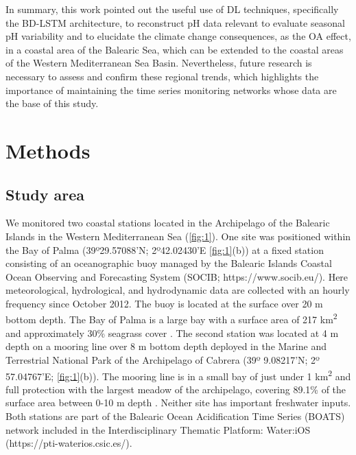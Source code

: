 In summary, this work pointed out the useful use of DL techniques,
specifically the BD-LSTM architecture, to reconstruct pH data relevant to
evaluate seasonal pH variability and to elucidate the climate change
consequences, as the OA effect, in a coastal area of the Balearic Sea, which
can be extended to the coastal areas of the Western Mediterranean Sea Basin.
Nevertheless, future research is necessary to assess and confirm these regional
trends, which highlights the importance of maintaining the time series
monitoring networks whose data are the base of this study.

\section{Methods}
\subsection*{Study area}
We monitored two coastal stations located in the Archipelago of the
Balearic Islands in the Western Mediterranean Sea (\cref{fig:1}). One site was
positioned within the Bay of Palma (39º29.57088’N; 2º42.02430’E
\cref{fig:1}(b)) at a fixed station consisting of an oceanographic buoy managed
by the Balearic Islands Coastal Ocean Observing and Forecasting System (SOCIB;
https://www.socib.eu/). Here meteorological, hydrological, and hydrodynamic
data
are collected with an hourly frequency since October 2012. The buoy is located
at the surface over 20 m bottom depth. The Bay of Palma is a large bay with a
surface area of 217 km\textsuperscript{2} and approximately 30\% seagrass
cover \cite{gazeau2005whole}. The second station was located at 4 m depth on a
mooring line over 8 m bottom depth deployed in the Marine and Terrestrial
National Park of the Archipelago of Cabrera (39º 9.08217’N; 2º 57.04767’E;
\cref{fig:1}(b)). The mooring line is in a small bay of just under 1
km\textsuperscript{2} and full protection with the largest meadow of the
archipelago, covering 89.1\% of the surface area between 0-10 m
depth \cite{marba2002effectiveness}. Neither site has important freshwater
inputs. Both stations are part of the Balearic Ocean Acidification Time Series
(BOATS) network included in the Interdisciplinary Thematic Platform: Water:iOS
(https://pti-waterios.csic.es/).

